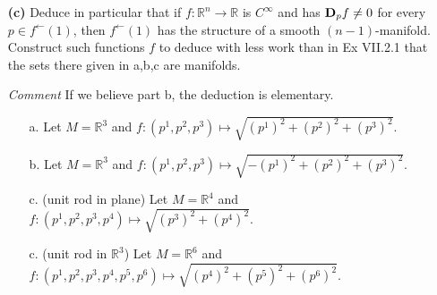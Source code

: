 \documentclass[11pt]{article}
\begin{document}
\begin{itemize}
 
\item[\textbf{(c)}] Deduce in particular that if $f\colon \mathbb{R}^n
  \rightarrow \mathbb{R}$ is $C^\infty$ and has ${\bf D}_pf \neq 0$ for every
  $p\in f^\leftarrow(1)$, then $f^\leftarrow(1)$ has the structure of a smooth
  $(n-1)$-manifold.  Construct such functions $f$ to deduce with less work than
  in Ex VII.2.1 that the sets there given in a,b,c are manifolds.
\item[\emph{Comment}]  If we believe part b, the deduction is elementary.
  \begin{enumerate}
  \item[a.] Let $M = \mathbb{R}^3$ and $f\colon (p^1,p^2,p^3) \mapsto
    \sqrt{(p^1)^2 + (p^2)^2 + (p^3)^2}$.
  \item[b.] Let $M = \mathbb{R}^3$ and $f\colon (p^1,p^2,p^3) \mapsto
    \sqrt{-(p^1)^2 + (p^2)^2 + (p^3)^2}$.
  \item[c.] (unit rod in plane) Let $M = \mathbb{R}^4$ and $f\colon (p^1,p^2,p^3,p^4) \mapsto
    \sqrt{(p^3)^2 + (p^4)^2}$.
  \item[c.] (unit rod in $\mathbb{R}^3$) Let $M = \mathbb{R}^6$ and $f\colon
    (p^1,p^2,p^3,p^4,p^5,p^6) \mapsto \sqrt{(p^4)^2 + (p^5)^2 + (p^6)^2}$.
  \end{enumerate}

\end{itemize}
\end{document}
